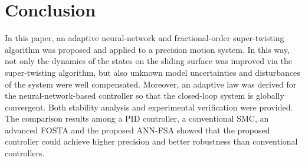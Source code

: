 \documentclass{ifacconf}
\begin{document}
   
   

    
 
\section{Conclusion}  \label{sec:conclusion}
In this paper, an adaptive neural-network and fractional-order super-twisting algorithm was proposed and applied to a precision motion system. In this way, not only the dynamics of the states on the sliding surface was improved via the super-twisting algorithm, but also unknown model uncertainties and disturbances of the system were well compensated. %
Moreover, an adaptive law was derived for the neural-network-based controller so that the closed-loop system is globally convergent. Both stability analysis and experimental verification were provided. The comparison results among a PID controller, a conventional SMC, an advanced FOSTA and the proposed ANN-FSA showed that the proposed controller could achieve higher precision and better robustness than conventional controllers.





                                                   


\end{document}

